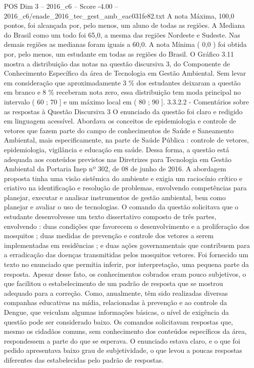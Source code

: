 \begin{textsample}{POS Dim 3 – 2016\_c6 – Score -4.00 – 2016\_c6/enade\_2016\_tec\_gest\_amb\_eac031fe82.txt}
A nota Máxima, 100,0 pontos, foi alcançada por, pelo menos, um aluno de todas as regiões.
A Mediana do Brasil como um todo foi 65,0, a mesma das regiões Nordeste e Sudeste.
Nas demais regiões as medianas foram iguais a 60,0.
A nota Mínima ( 0,0 ) foi obtida por, pelo menos, um estudante em todas as regiões do Brasil.
O Gráfico 3.11 mostra a distribuição das notas na questão discursiva 3, do Componente de Conhecimento Específico da área de Tecnologia em Gestão Ambiental.
Sem levar em consideração que aproximadamente 3 \% dos estudantes deixaram a questão em branco e 8 \% receberam nota zero, essa distribuição tem moda principal no intervalo ( 60 ; 70 ] e um máximo local em ( 80 ; 90 ]. 3.3.2.2 - Comentários sobre as respostas à Questão Discursiva 3 O enunciado da questão foi claro e redigido em linguagem acessível.
Abordava os conceitos de epidemiologia e controle de vetores que fazem parte do campo de conhecimentos de Saúde e Saneamento Ambiental, mais especificamente, na parte de Saúde Pública : controle de vetores, epidemiologia, vigilância e educação em saúde.
Dessa forma, a questão está adequada aos conteúdos previstos nas Diretrizes para Tecnologia em Gestão Ambiental da Portaria Inep nº 302, de 08 de junho de 2016.
A abordagem proposta tinha uma visão sistêmica do ambiente e exigia um raciocínio crítico e criativo na identificação e resolução de problemas, envolvendo competências para planejar, executar e analisar instrumentos de gestão ambiental, bem como planejar e avaliar o uso de tecnologias.
O comando da questão solicitava que o estudante desenvolvesse um texto dissertativo composto de três partes, envolvendo : duas condições que favorecem o desenvolvimento e a proliferação dos mosquitos ; duas medidas de prevenção e controle dos vetores a serem implementadas em residências ; e duas ações governamentais que contribuem para a erradicação das doenças transmitidas pelos mosquitos vetores.
Foi fornecido um texto no enunciado que permitia inferir, por interpretação, uma pequena parte da resposta.
Apesar desse fato, os conhecimentos cobrados eram pouco subjetivos, o que facilitou o estabelecimento de um padrão de resposta que se mostrou adequado para a correção.
Como, anualmente, têm sido realizadas diversas companhas educativas na mídia, relacionadas à prevenção e ao controle da Dengue, que veiculam algumas informações básicas, o nível de exigência da questão pode ser considerado baixo.
Os comandos solicitavam respostas que, mesmo os cidadãos comuns, sem conhecimento dos conteúdos específicos da área, respondessem a parte do que se esperava.
O enunciado estava claro, e o que foi pedido apresentava baixo grau de subjetividade, o que levou a poucas respostas diferentes das estabelecidas pelo padrão de respostas.

\end{textsample}
